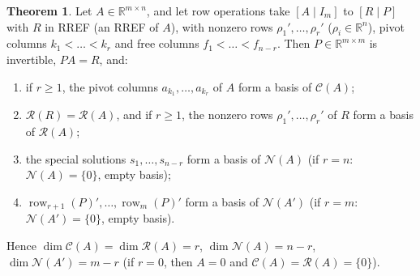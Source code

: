 \documentclass[12pt]{article}
\newcommand{\R}{\mathbb R}
\theoremstyle{definition}
\newtheorem{theorem}{Theorem}
\DeclareMathOperator{\row}{row}
\begin{document}
\begin{theorem}\label{b4.8}
Let \(A\in\R^{m\times n}\), and let row operations take \([A\mid I_m]\) to \([R\mid P]\) with \(R\) in RREF (an RREF of
\(A\)), with nonzero rows \(\rho_1',\dots,\rho_r'\) (\(\rho_i\in\R^n\)), pivot columns \(k_1<\dots<k_r\) and free columns
\(f_1<\dots<f_{n-r}\). Then \(P\in\R^{m\times m}\) is invertible, \(PA=R\), and:
\begin{enumerate}
\item if \(r\geqslant1\), the pivot columns \(a_{k_1},\dots,a_{k_r}\) of \(A\) form a basis of \(\mathcal C(A)\);
\item \(\mathcal R(R)=\mathcal R(A)\), and if \(r\geqslant1\), the nonzero rows \(\rho_1',\dots,\rho_r'\) of \(R\) form a
basis of \(\mathcal R(A)\);
\item the special solutions \(s_1,\dots,s_{n-r}\) form a basis of \(\mathcal N(A)\) (if \(r=n\): \(\mathcal N(A)=\{0\}\),
empty basis);
\item \(\row_{r+1}(P)',\dots,\row_m(P)'\) form a basis of \(\mathcal N(A')\) (if \(r=m\): \(\mathcal N(A')=\{0\}\), empty
basis).
\end{enumerate}
Hence \(\dim\mathcal C(A)=\dim\mathcal R(A)=r\), \(\dim\mathcal N(A)=n-r\), \(\dim\mathcal N(A')=m-r\) (if \(r=0\), then
\(A=0\) and \(\mathcal C(A)=\mathcal R(A)=\{0\}\)).
\end{theorem}
\end{document}
